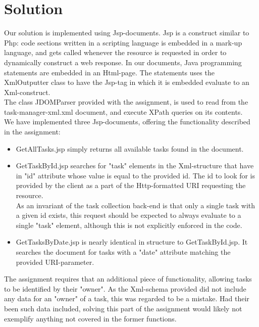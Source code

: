 	\section{Solution}
	\label{servlet_solution}
	Our solution is implemented using Jsp-documents. Jsp is a construct similar to Php: code sections written in a scripting language is embedded in a mark-up language, and gets called whenever the resource is requested in order to dynamically construct a web response. In our documents, Java programming statements are embedded in an Html-page. The statements uses the XmlOutputter class to have the Jsp-tag in which it is embedded evaluate to an Xml-construct.\\
	The class JDOMParser provided with the assignment, is used to read from the task-manager-xml.xml document, and execute XPath queries on its contents.\\
	We have implemented three Jsp-documents, offering the functionality described in the assignment:
	\begin{itemize}
		\item GetAllTasks.jsp simply returns all available tasks found in the document. 
		\item GetTaskById.jsp searches for "task" elements in the Xml-structure that have in "id" attribute whose value is equal to the provided id. The id to look for is provided by the client as a part of the Http-formatted URI requesting the resource.\\
		As an invariant of the task collection back-end is that only a single task with a given id exists, this request should be expected to always evaluate to a single "task" element, although this is not explicitly enforced in the code.
		\item GetTasksByDate.jsp is nearly identical in structure to GetTaskById.jsp. It searches the document for tasks with a "date" attribute matching the provided URI-parameter. 
	\end{itemize}
	The assignment requires that an additional piece of functionality, allowing tasks to be identified by their "owner". As the Xml-schema provided did not include any data for an "owner" of a task, this was regarded to be a mistake. Had their been such data included, solving this part of the assignment would likely not exemplify anything not covered in the former functions. 
	
